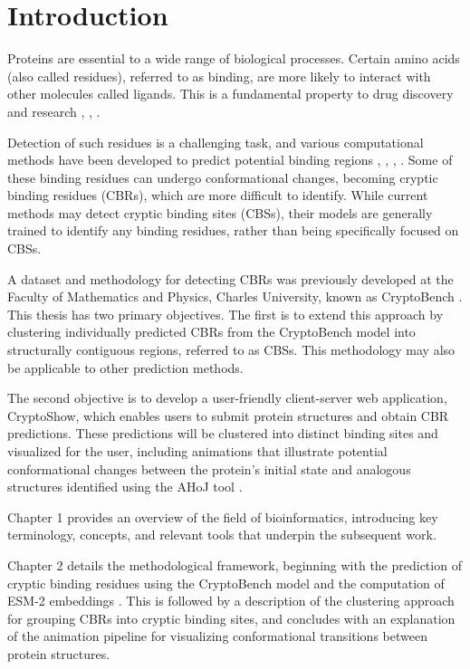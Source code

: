 \chapter*{Introduction}

Proteins are essential to a wide range of biological processes. Certain amino acids (also called residues), referred to as binding, are more likely to interact with other molecules called ligands. This is a fundamental property to drug discovery and research \cite{trainor2007importance}, \cite{ballante2021protein}, \cite{mannhold2006protein}.

Detection of such residues is a challenging task, and various computational methods have been developed to predict potential binding regions \cite{krivak2018p2rank}, \cite{le2009fpocket}, \cite{aggarwal2021deeppocket}, \cite{smith2024graph}. Some of these binding residues can undergo conformational changes, becoming cryptic binding residues (CBRs), which are more difficult to identify. While current methods may detect cryptic binding sites (CBSs), their models are generally trained to identify any binding residues, rather than being specifically focused on CBSs.

A dataset and methodology for detecting CBRs was previously developed at the Faculty of Mathematics and Physics, Charles University, known as CryptoBench \cite{vskrhak2025cryptobench}. This thesis has two primary objectives. The first is to extend this approach by clustering individually predicted CBRs from the CryptoBench model into structurally contiguous regions, referred to as CBSs. This methodology may also be applicable to other prediction methods.

The second objective is to develop a user-friendly client-server web application, CryptoShow, which enables users to submit protein structures and obtain CBR predictions. These predictions will be clustered into distinct binding sites and visualized for the user, including animations that illustrate potential conformational changes between the protein's initial state and analogous structures identified using the AHoJ tool \cite{feidakis2022ahoj}.

Chapter 1 provides an overview of the field of bioinformatics, introducing key terminology, concepts, and relevant tools that underpin the subsequent work.

Chapter 2 details the methodological framework, beginning with the prediction of cryptic binding residues using the CryptoBench model and the computation of ESM-2 embeddings \cite{lin2022language}. This is followed by a description of the clustering approach for grouping CBRs into cryptic binding sites, and concludes with an explanation of the animation pipeline for visualizing conformational transitions between protein structures.

